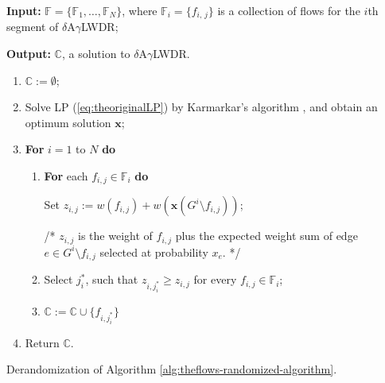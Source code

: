 \documentclass[11pt,english,onecolumn,draftcls]{IEEEtran}
\theoremstyle{plain}
\theoremstyle{plain}
\theoremstyle{plain}
\theoremstyle{plain}
\begin{document}
\begin{algorithm}
\textbf{Input: }$\mathbb{F}=\{\mathbb{F}_{1},\dots,\mathbb{F}_{N}\}$,
where $\mathbb{F}_{i}=\{f_{i,\, j}\}$ is a collection of flows for
the $i$th segment of $\delta$A$\gamma$LWDR;

\textbf{Output:} $\mathbb{C}$, a solution to $\delta$A$\gamma$LWDR.
\begin{enumerate}
\item $\mathbb{C}:=\emptyset$;
\item Solve LP (\ref{eq:theoriginalLP}) by Karmarkar's algorithm \cite{schrijver1998theory},
and obtain an optimum solution $\mathbf{x}$;
\item \textbf{For} $i=1$ to $N$ \textbf{do }

\begin{enumerate}
\item \textbf{For} each $f_{i,j}\in\mathbb{F}_{i}$ \textbf{do}


\quad{}Set $z_{i,j}:=w(f_{i,j})+w(\mathbf{x}(G^{i}\setminus f_{i,j}))$;


\quad{}/{*} $z_{i,j}$ is the weight of $f_{i,j}$ plus the expected
weight sum of edge $e\in G^{i}\setminus f_{i,j}$ selected at probability
$x_{e}$. {*}/

\item Select $j_{i}^{*}$, such that $z_{i,j_{i}^{*}}\geq z_{i,j}$ for
every $f_{i,j}\in\mathbb{F}_{i}$;
\item $\mathbb{C}:=\mathbb{C}\cup\{f_{i,j_{i}^{*}}\}$
\end{enumerate}
\item Return $\mathbb{C}$.
\end{enumerate}
\protect\caption{\label{alg:the1stderandomization}Derandomization of Algorithm \ref{alg:theflows-randomized-algorithm}.}
\end{algorithm}
\end{document}
